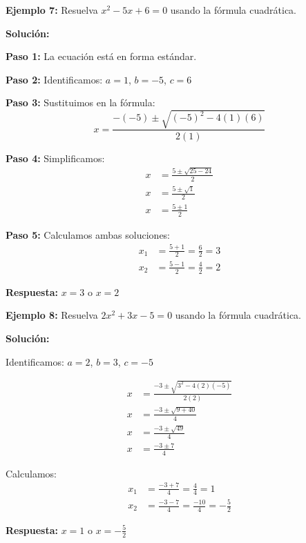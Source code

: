 \newpage

\begin{example}
\textbf{Ejemplo 7:} Resuelva $x^2 - 5x + 6 = 0$ usando la fórmula cuadrática.

\textbf{Solución:}

\textbf{Paso 1:} La ecuación está en forma estándar.

\textbf{Paso 2:} Identificamos: $a = 1$, $b = -5$, $c = 6$

\textbf{Paso 3:} Sustituimos en la fórmula:
$$x = \frac{-(-5) \pm \sqrt{(-5)^2 - 4(1)(6)}}{2(1)}$$

\textbf{Paso 4:} Simplificamos:
\begin{align}
x &= \frac{5 \pm \sqrt{25 - 24}}{2}\\
x &= \frac{5 \pm \sqrt{1}}{2}\\
x &= \frac{5 \pm 1}{2}
\end{align}

\textbf{Paso 5:} Calculamos ambas soluciones:
\begin{align}
x_1 &= \frac{5 + 1}{2} = \frac{6}{2} = 3\\
x_2 &= \frac{5 - 1}{2} = \frac{4}{2} = 2
\end{align}

\textbf{Respuesta:} $x = 3$ o $x = 2$
\end{example}

\begin{example}
\textbf{Ejemplo 8:} Resuelva $2x^2 + 3x - 5 = 0$ usando la fórmula cuadrática.

\textbf{Solución:}

Identificamos: $a = 2$, $b = 3$, $c = -5$

\begin{align}
x &= \frac{-3 \pm \sqrt{3^2 - 4(2)(-5)}}{2(2)}\\
x &= \frac{-3 \pm \sqrt{9 + 40}}{4}\\
x &= \frac{-3 \pm \sqrt{49}}{4}\\
x &= \frac{-3 \pm 7}{4}
\end{align}

Calculamos:
\begin{align}
x_1 &= \frac{-3 + 7}{4} = \frac{4}{4} = 1\\
x_2 &= \frac{-3 - 7}{4} = \frac{-10}{4} = -\frac{5}{2}
\end{align}

\textbf{Respuesta:} $x = 1$ o $x = -\frac{5}{2}$
\end{example}

